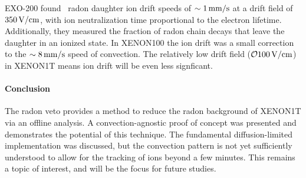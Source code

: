 EXO-200 found~\cite{Albert:2015vma} radon daughter ion drift speeds of $\sim 1\,\mathrm{mm/s}$ at a drift field of $350\,\mathrm{V/cm}$, with ion neutralization time proportional to the electron lifetime. Additionally, they measured the fraction of radon chain decays that leave the daughter in an ionized state. In XENON100 the ion drift was a small correction to the $\sim 8\,\mathrm{mm/s}$ speed of convection. The relatively low drift field ($\mathcal{O}{100}\,\mathrm{V/cm}$) in XENON1T means ion drift will be even less signficant.

\paragraph{Conclusion}

The radon veto provides a method to reduce the radon background of XENON1T via an offline analysis. A convection-agnostic proof of concept was presented and demonstrates the potential of this technique. The fundamental diffusion-limited implementation was discussed, but the convection pattern is not yet sufficiently understood to allow for the tracking of ions beyond a few minutes. This remains a topic of interest, and will be the focus for future studies.